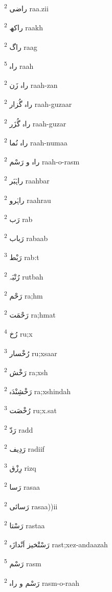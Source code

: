 \documentclass[12pt]{article}
\begin{document}
\begin{multicols}{5}
{\ur راضی}   \textsuperscript{2} raa.zii

{\ur راکھ}   \textsuperscript{2} raakh

{\ur راگ}   \textsuperscript{2} raag

{\ur راہ}   \textsuperscript{5} raah

{\ur راہ زَن}   \textsuperscript{2} raah-zan

{\ur راہ گُزار}   \textsuperscript{2} raah-guzaar

{\ur راہ گُزَر}   \textsuperscript{2} raah-guzar

{\ur راہ نُما}   \textsuperscript{2} raah-numaa

{\ur راہ و رَسْم}   \textsuperscript{2} raah-o-rasm

{\ur راہْبَر}   \textsuperscript{2} raahbar

{\ur راہْرو}   \textsuperscript{2} raahrau

{\ur رَب}   \textsuperscript{2} rab

{\ur رَباب}   \textsuperscript{2} rabaab

{\ur رَبْط}   \textsuperscript{3} rab:t

{\ur رُتْبَہ}   \textsuperscript{2} rutbah

{\ur رَحْم}   \textsuperscript{2} ra;hm

{\ur رَحْمَت}   \textsuperscript{2} ra;hmat

{\ur رُخ}   \textsuperscript{4} ru;x

{\ur رُخْسار}   \textsuperscript{3} ru;xsaar

{\ur رَخْش}   \textsuperscript{2} ra;xsh

{\ur رَخْشِنْدَہ}   \textsuperscript{2} ra;xshindah

{\ur رُخْصَت}   \textsuperscript{3} ru;x.sat

{\ur رَدّ}   \textsuperscript{2} radd

{\ur رَدِیف}   \textsuperscript{2} radiif

{\ur رِزْق}   \textsuperscript{3} rizq

{\ur رَسا}   \textsuperscript{2} rasaa

{\ur رَسائی}   \textsuperscript{2} rasaa))ii

{\ur رَسْتا}   \textsuperscript{2} rastaa

{\ur رَسْتْخیز اَنْدازَہ}   \textsuperscript{2} rast;xez-andaazah

{\ur رَسْم}   \textsuperscript{5} rasm

{\ur رَسْم و راہ}   \textsuperscript{2} rasm-o-raah


\end{multicols}
\end{document}
